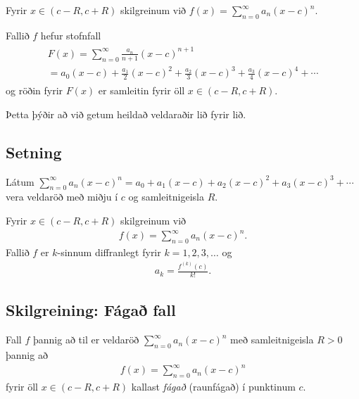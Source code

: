 \documentclass[a4paper,10pt,icelandic]{sphinxmanual}
\begin{document}
Fyrir \(x\in(c-R, c+R)\) skilgreinum við
\(f(x)=\sum_{n=0}^\infty a_n(x-c)^n\).

Fallið \(f\) hefur stofnfall
\begin{equation*}
\begin{split}\begin{gathered}
F(x)=\sum_{n=0}^\infty \frac{a_n}{n+1}(x-c)^{n+1} \\
=a_0(x-c)+\frac{a_1}{2}(x-c)^2+\frac{a_2}{3}(x-c)^3+
\frac{a_3}{4}(x-c)^4+\cdots\end{gathered}\end{split}
\end{equation*}
og röðin fyrir \(F(x)\) er samleitin fyrir öll
\(x\in(c-R, c+R)\).

Þetta þýðir að við getum heildað veldaraðir lið fyrir lið.


\subsection{Setning}
\label{kafli10:id3}
Látum \(\sum_{n=0}^\infty a_n(x-c)^n=a_0+a_1(x-c)+a_2(x-c)^2+a_3(x-c)^3+\cdots\)
vera veldaröð með miðju í \(c\) og samleitnigeisla \(R\).

Fyrir \(x\in(c-R, c+R)\) skilgreinum við
\begin{equation*}
\begin{split}f(x)=\sum_{n=0}^\infty a_n(x-c)^n.\end{split}
\end{equation*}
Fallið \(f\) er \(k\)-sinnum diffranlegt fyrir \(k=1, 2, 3, \ldots\) og
\begin{equation*}
\begin{split}a_k=\frac{f^{(k)}(c)}{k!}.\end{split}
\end{equation*}

\subsection{Skilgreining: Fágað fall}
\label{kafli10:skilgreining-faga-fall}\label{kafli10:index-5}
Fall \(f\) þannig að til er veldaröð
\(\sum_{n=0}^\infty a_n(x-c)^n\) með samleitnigeisla \(R>0\)
þannig að
\begin{equation*}
\begin{split}f(x)=\sum_{n=0}^\infty a_n(x-c)^n\end{split}
\end{equation*}
fyrir öll \(x\in(c-R, c+R)\) kallast \emph{fágað} (raunfágað) í punktinum
\(c\).
\end{document}
